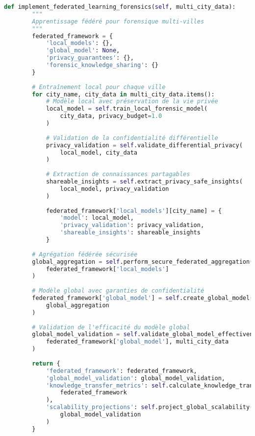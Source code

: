 \begin{lstlisting}[language=Python, caption=Framework Smart Nation pour forensique urbaine]
    def implement_federated_learning_forensics(self, multi_city_data):
        """
        Apprentissage fédéré pour forensique multi-villes
        """
        federated_framework = {
            'local_models': {},
            'global_model': None,
            'privacy_guarantees': {},
            'forensic_knowledge_sharing': {}
        }
        
        # Entraînement local pour chaque ville
        for city_name, city_data in multi_city_data.items():
            # Modèle local avec préservation de la vie privée
            local_model = self.train_local_forensic_model(
                city_data, privacy_budget=1.0
            )
            
            # Validation de la confidentialité différentielle
            privacy_validation = self.validate_differential_privacy(
                local_model, city_data
            )
            
            # Extraction de connaissances partagables
            shareable_insights = self.extract_privacy_safe_insights(
                local_model, privacy_validation
            )
            
            federated_framework['local_models'][city_name] = {
                'model': local_model,
                'privacy_validation': privacy_validation,
                'shareable_insights': shareable_insights
            }
            
        # Agrégation fédérée sécurisée
        global_aggregation = self.perform_secure_federated_aggregation(
            federated_framework['local_models']
        )
        
        # Modèle global avec garanties de confidentialité
        federated_framework['global_model'] = self.create_global_model(
            global_aggregation
        )
        
        # Validation de l'efficacité du modèle global
        global_model_validation = self.validate_global_model_effectiveness(
            federated_framework['global_model'], multi_city_data
        )
        
        return {
            'federated_framework': federated_framework,
            'global_model_validation': global_model_validation,
            'knowledge_transfer_metrics': self.calculate_knowledge_transfer_metrics(
                federated_framework
            ),
            'scalability_projections': self.project_global_scalability(
                global_model_validation
            )
        }
\end{lstlisting}

